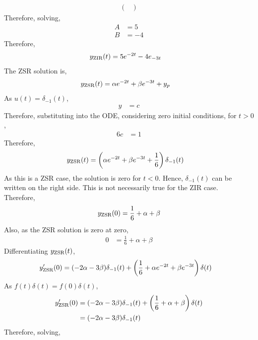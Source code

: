 \documentclass[fleqn, a4paper, 12pt, twoside]{article}
\theoremstyle{definition}
\theoremstyle{theorem}
\begin{document}
\begin{solution}
\begin{align*}
\begin{pmatrix}
			\end{pmatrix}
	\end{align*}
	Therefore, solving,
	\begin{align*}
		A & = 5 \\
		B & = -4
	\end{align*}
	Therefore,
	\begin{align*}
		y_{\textnormal{ZIR}}(t) & = 5 e^{-2 t} - 4 e_{-3 t}
	\end{align*}
	The ZSR solution is,
	\begin{align*}
		y_{\textnormal{ZSR}}(t) & = \alpha e^{-2 t} + \beta e^{-3 t} + y_p
	\end{align*}
	As $u(t) = \delta_{-1}(t)$,
	\begin{align*}
		y & = c
	\end{align*}
	Therefore, substituting into the ODE, considering zero initial conditions, for $t > 0$,
	\begin{align*}
		6 c & = 1
	\end{align*}
	Therefore,
	\begin{align*}
		y_{\textnormal{ZSR}}(t) & = \left( \alpha e^{-2 t} + \beta e^{-3 t} + \frac{1}{6} \right) \delta_{-1}(t)
	\end{align*}
	As this is a ZSR case, the solution is zero for $t < 0$.
	Hence, $\delta_{-1}(t)$ can be written on the right side.
	This is not necessarily true for the ZIR case.\\
	Therefore,
	\begin{align*}
		y_{\textnormal{ZSR}}(0) & = \frac{1}{6} + \alpha + \beta \\
	\end{align*}
	Also, as the ZSR solution is zero at zero,
	\begin{align*}
		0 & = \frac{1}{6} + \alpha + \beta
	\end{align*}
	Differentiating $y_{\textnormal{ZSR}}(t)$,
	\begin{align*}
		y_{\textnormal{ZSR}}'(0) & = (-2 \alpha - 3 \beta) \delta_{-1}(t) + \left( \frac{1}{6} + \alpha e^{-2 t} + \beta e^{-3 t} \right) \delta(t)
	\end{align*}
	As $f(t) \delta(t) = f(0) \delta(t)$,
	\begin{align*}
		y_{\textnormal{ZSR}}'(0) & = (-2 \alpha - 3 \beta) \delta_{-1}(t) + \left( \frac{1}{6} + \alpha + \beta \right) \delta(t) \\
                                         & = (-2 \alpha - 3 \beta) \delta_{-1}(t)
	\end{align*}
	Therefore, solving,

\end{solution}
\end{document}

